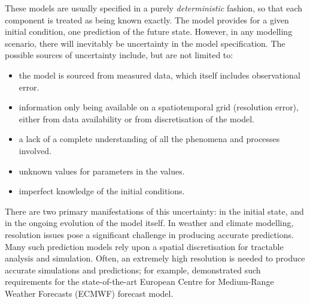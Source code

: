 These models are usually specified in a purely \emph{deterministic} fashion, so that each component is treated as being known exactly.
The model provides for a given initial condition, one prediction of the future state.
However, in any modelling scenario, there will inevitably be uncertainty in the model specification.
The possible sources of uncertainty include, but are not limited to:
\begin{itemize}
	\item the model is sourced from measured data, which itself includes observational error.
	\item information only being available on a spatiotemporal grid (resolution error), either from data availability or from discretisation of the model.
	\item a lack of a complete understanding of all the phenomena and processes involved.
	\item unknown values for parameters in the values.
	\item imperfect knowledge of the initial conditions.
\end{itemize}
There are two primary manifestations of this uncertainty: in the initial state, and in the ongoing evolution of the model itself.
In weather and climate modelling, resolution issues pose a significant challenge in producing accurate predictions.
Many such prediction models rely upon a spatial discretisation for tractable analysis and simulation.
Often, an extremely high resolution is needed to produce accurate simulations and predictions; for example, \citet{DawsonEtAl_2012_SimulatingRegimeStructures} demonstrated such requirements for the state-of-the-art European Centre for Medium-Range Weather Forecasts (ECMWF) forecast model.


